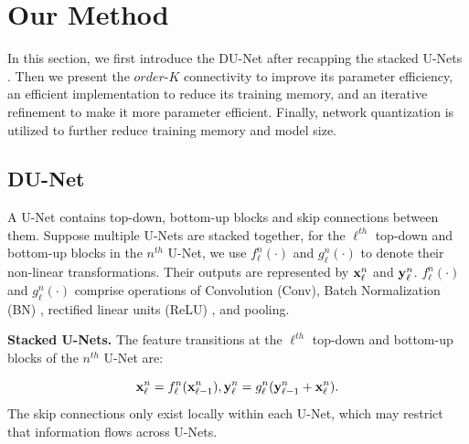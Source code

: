 \section{Our Method}
In this section, we first introduce the DU-Net after recapping the stacked U-Nets \cite{newell2016stacked}. Then we present the $order$-$K$ connectivity to improve its parameter efficiency, an efficient implementation to reduce its training memory,
and an iterative refinement to make it more parameter efficient.
Finally, network quantization is utilized to further reduce training memory and model size.
\subsection{DU-Net}
A U-Net contains top-down, bottom-up blocks and skip connections between them. Suppose multiple U-Nets are stacked together, for the $\ell^{th}$ top-down and bottom-up blocks in the $n^{th}$ U-Net, we use $f_\ell^n(\cdot)$ and $g_\ell^n(\cdot)$ to denote their non-linear transformations. Their outputs are represented by ${\bf x}_\ell^n$ and ${\bf y}_\ell^n$. $f_\ell^n(\cdot)$ and $g_\ell^n(\cdot)$ comprise operations of Convolution (Conv), Batch Normalization (BN) \cite{ioffe2015batch}, rectified linear units (ReLU) \cite{glorot2011deep}, and pooling.

{\bf Stacked U-Nets.} The feature transitions at the $\ell^{th}$ top-down and bottom-up blocks of the $n^{th}$ U-Net are:

\begin{equation}\label{eq:hg}
    {\bf x}_\ell^n = f_\ell^n({\bf x}_{\ell-1}^n), {\bf y}_\ell^n = g_\ell^n({\bf y}_{\ell-1}^n+{\bf x}_\ell^n).
\end{equation}
The skip connections only exist locally within each U-Net, which may restrict that information flows across U-Nets.

